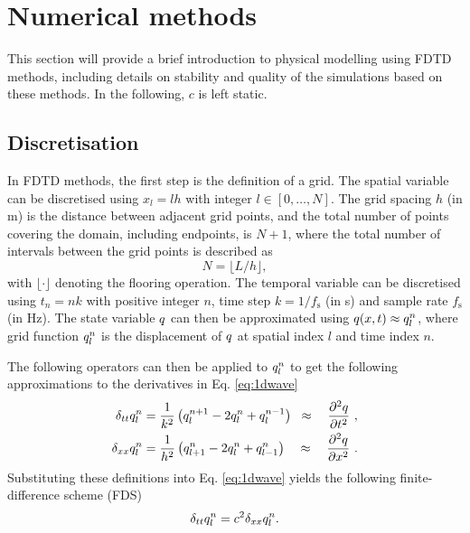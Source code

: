 \section{Numerical methods}\label{sec:FDTD}
This section will provide a brief introduction to physical modelling using FDTD methods, including details on stability and quality of the simulations based on these methods. In the following, $c$ is left static.

\subsection{Discretisation}
In FDTD methods, the first step is the definition of a grid. The spatial variable can be discretised using $x_l = lh$ %
with integer $l \in [0, \hdots, N]$. The grid spacing $h$ (in m) is the distance between adjacent grid points, and the total number of points covering the domain, including endpoints, is $N + 1$, where the total number of intervals between the grid points is described as
\begin{equation}\label{eq:numberOfIntervals}
    N = \lfloor L/h\rfloor,
\end{equation}
\SBcomment[Easier to write this as $h=L/N$, for integer $N$, so without a flooring operation.] \SBcomment[OK, but from the above, we don't have $L=Nh$, so the total domain length is off...well, at least for a standard domain!]
with $\lfloor \cdot \rfloor$ denoting the flooring operation. The temporal variable can be discretised using $t_n = nk$ with positive integer $n$, time step $k = 1/f_\text{s}$ (in s) and sample rate $f_\text{s}$ (in Hz). The state variable $q$ can then be approximated using $q(x,t) \approx q_l^n$, where grid function $q_l^n$ is the displacement of $q$ at spatial index $l$ and time index $n$. %

The following operators can then be applied to $q_l^n$ to get the following approximations to the derivatives in Eq. \eqref{eq:1dwave}
\begin{subequations}\label{eq:operators}
    \begin{align}
         \delta_{tt}q_l^n &= \frac{1}{k^2}\left(q_l^{n+1}-2q_l^n + q_l^{n-1}\right)\;\;\approx\quad\frac{\partial^2q}{\partial t^2}\label{eq:secondOrderTime}\ ,\\
         \delta_{xx}q_l^n &= \frac{1}{h^2}\left(q_{l+1}^n-2q_l^n + q_{l-1}^n\right)\quad\approx\quad \frac{\partial^2q}{\partial x^2}\ .\label{eq:secondOrderSpace}
    \end{align}
\end{subequations}
Substituting these definitions into Eq. \eqref{eq:1dwave} yields the following finite-difference scheme (FDS)
\begin{equation}\label{eq:FDS}
    \delta_{tt}q_l^n = c^2 \delta_{xx}q_l^n.
\end{equation}

